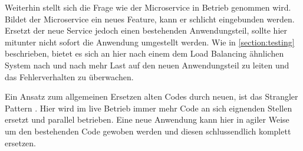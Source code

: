 Weiterhin stellt sich die Frage wie der Microservice in Betrieb genommen wird. Bildet der Microservice ein neues Feature, kann er schlicht eingebunden werden. Ersetzt der neue Service jedoch einen bestehenden Anwendungsteil, sollte hier mitunter nicht sofort die Anwendung umgestellt werden. Wie in \autoref{section:testing} beschrieben, bietet es sich an hier nach einem dem Load Balancing ähnlichen System nach und nach mehr Last auf den neuen Anwendungsteil zu leiten und das Fehlerverhalten zu überwachen.

Ein Ansatz zum allgemeinen Ersetzen alten Codes durch neuen, ist das Strangler Pattern \cite[][]{Fowler:Strangler}. Hier wird im live Betrieb immer mehr Code an sich eignenden Stellen ersetzt und parallel betrieben. Eine neue Anwendung kann hier in agiler Weise um den bestehenden Code gewoben werden und diesen schlussendlich komplett ersetzen.
